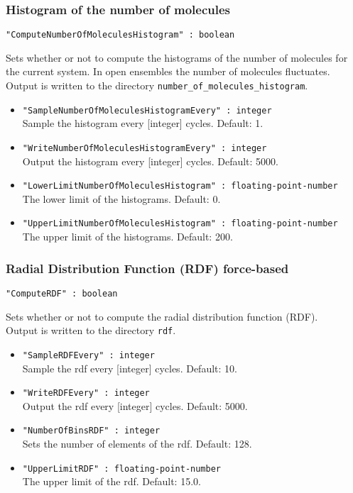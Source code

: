 \subsubsection{Histogram of the number of molecules}
\begin{framed}
\verb+"ComputeNumberOfMoleculesHistogram" : boolean+
\end{framed}
Sets whether or not to compute the histograms of the number of molecules for the current system.
In open ensembles the number of molecules fluctuates.\\
Output is written to the directory \verb+number_of_molecules_histogram+.
\begin{itemize}
\item{\verb+"SampleNumberOfMoleculesHistogramEvery" : integer+}\\
Sample the histogram every [integer] cycles. Default: 1.
\item{\verb+"WriteNumberOfMoleculesHistogramEvery" : integer+}\\
Output the histogram every [integer] cycles. Default: 5000.
\item{\verb+"LowerLimitNumberOfMoleculesHistogram" : floating-point-number+}\\
The lower limit of the histograms. Default: 0.
\item{\verb+"UpperLimitNumberOfMoleculesHistogram" : floating-point-number+}\\
The upper limit of the histograms. Default: 200.
\end{itemize}

\subsubsection{Radial Distribution Function (RDF) force-based}
\begin{framed}
\verb+"ComputeRDF" : boolean+
\end{framed}
Sets whether or not to compute the radial distribution function (RDF).\\
Output is written to the directory \verb+rdf+.
\begin{itemize}
\item{\verb+"SampleRDFEvery" : integer+}\\
Sample the rdf every [integer] cycles. Default: 10.
\item{\verb+"WriteRDFEvery" : integer+}\\
Output the rdf every [integer] cycles. Default: 5000.
\item{\verb+"NumberOfBinsRDF" : integer+}\\
Sets the number of elements of the rdf. Default: 128.
\item{\verb+"UpperLimitRDF" : floating-point-number+}\\
The upper limit of the rdf. Default: 15.0.
\end{itemize}


